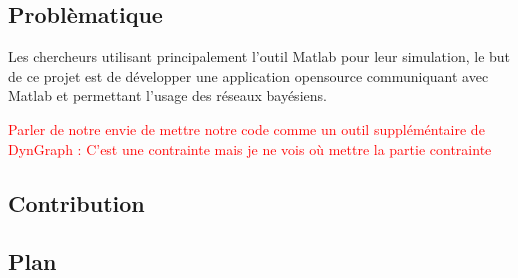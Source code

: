 \documentclass[conference]{IEEEtran}
\begin{document}
\subsection{Problèmatique}
Les chercheurs utilisant principalement l'outil Matlab pour leur simulation, le but de ce projet est de développer une application opensource communiquant avec Matlab et permettant l'usage des réseaux bayésiens.

\textcolor{red}{Parler de notre envie de mettre notre code comme un outil suppléméntaire de DynGraph : C'est une contrainte mais je ne vois où mettre la partie contrainte }

\subsection{Contribution}


\subsection{Plan}

\tableofcontents




%
%

\end{document}
